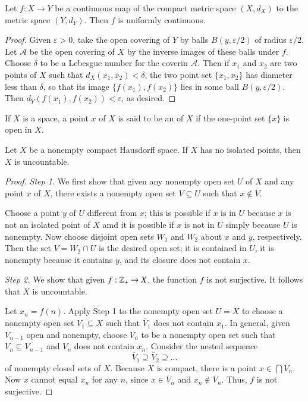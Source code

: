\documentclass[12pt, a4paper, oneside, openright, titlepage]{book}
\begin{document}
\begin{namthm}
    Let $f:X\rightarrow Y$ be a continuous map of the compact metric space $(X,d_X)$ to the metric space $(Y,d_Y)$. Then $f$ is uniformly continuous.
\end{namthm}
\begin{proof}
    Given $\varepsilon >0$, take the open covering of $Y$ by balls $B(y,\varepsilon/2)$ of radius $\varepsilon/2$. Let $\mathcal{A}$ be the open covering of $X$ by the inverse images of these balls under $f$. Choose $\delta$ to be a Lebesgue number for the coverin $\mathcal{A}$. Then if $x_1$ and $x_2$ are two points of $X$ such that $d_X(x_1,x_2) < \delta$, the two point set $\{x_1,x_2\}$ has diameter less than $\delta$, so that its image $\{f(x_1),f(x_2)\}$ lies in some ball $B(y,\varepsilon/2)$. Then $d_Y(f(x_1),f(x_2)) < \varepsilon$, as desired.
\end{proof}

\begin{defn}
    If $X$ is a space, a point $x$ of $X$ is said to be an  of $X$ if the one-point set $\{x\}$ is open in $X$.
\end{defn}


\begin{thm}
    Let $X$ be a nonempty compact Hausdorff space. If $X$ has no isolated points, then $X$ is uncountable.
\end{thm}
\begin{proof}
    \emph{Step 1.} We first show that given any nonempty open set $U$ of $X$ and any point $x$ of $X$, there exists a nonempty open set $V \subseteq U$ such that $x \notin \overline{V}$.

    Choose a point $y$ of $U$ different from $x$; this is possible if $x$ is in $U$ because $x$ is not an isolated point of $X$ amd it is possible if $x$ is not in $U$ simply because $U$ is nonempty. Now choose disjoint open sets $W_1$ and $W_2$ about $x$ and $y$, respectively. Then the set $V = W_2 \cap U$ is the desired open set; it is contained in $U$, it is nonempty because it contains $y$, and its closure does not contain $x$.

    \emph{Step 2.} We show that given $f:\mathbb Z_+\rightarrow X$, the function $f$ is not surjective. It follows that $X$ is uncountable.

    Let $x_n = f(n)$. Apply Step 1 to the nonempty open set $U = X$ to choose a nonempty open set $V_1 \subseteq X$ such that $\overline{V}_1$ does not contain $x_1$. In general, given $V_{n-1}$ open and nonempty, choose $V_n$ to be a nonempty open set such that $V_n \subseteq V_{n-1}$ and $V_n$ does not contain $x_n$. Consider the nested sequence \begin{equation*}
        \overline{V}_1\supseteq \overline{V}_2\supseteq ...
    \end{equation*}
    of nonempty closed sets of $X$. Because $X$ is compact, there is a point $x \in \bigcap\overline{V}_n$. Now $x$ cannot equal $x_n$ for any $n$, since $x \in \overline{V}_n$ and $x_n \notin \overline{V}_n$. Thus, $f$ is not surjective.
\end{proof}
\end{document}
